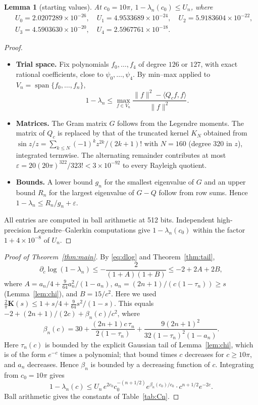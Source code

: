 \documentclass[11pt]{amsart}
\newtheorem{lemma}[proposition]{Lemma}
\theoremstyle{remark}
\numberwithin{equation}{section}
\newcommand{\Kell}{\mathbf{K}}
\begin{document}
\begin{lemma}[starting values]\label{lem:start}
At $c_0=10\pi$, $1-\lambda_n(c_0)\le U_n$, where
\[
\begin{aligned}
&U_0=2.0207289\times10^{-26},\quad U_1=4.9533689\times10^{-24},\quad U_2=5.9183604\times10^{-22},\\
&U_3=4.5903630\times10^{-20},\quad U_4=2.5967761\times10^{-18}.
\end{aligned}
\]
\end{lemma}
\begin{proof}
\begin{itemize}
\item \textbf{Trial space.} Fix polynomials $f_0,\dots,f_4$ of degree $126$ or $127$, with exact rational coefficients, close to $\psi_0,\dots,\psi_4$. By min--max applied to $V_n=\operatorname{span}\{f_0,\dots,f_n\}$,
\[
1-\lambda_n\le\max_{f\in V_n}\frac{\|f\|^2-\langle Q_cf,f\rangle}{\|f\|^2}.
\]
\item \textbf{Matrices.} The Gram matrix $G$ follows from the Legendre moments. The matrix of $Q_c$ is replaced by that of the truncated kernel $K_N$ obtained from $\sin z/z=\sum_{k\le N}(-1)^kz^{2k}/(2k+1)!$ with $N=160$ (degree $320$ in $z$), integrated termwise. The alternating remainder contributes at most $\varepsilon=20(20\pi)^{322}/323!<3\times10^{-92}$ to every Rayleigh quotient.
\item \textbf{Bounds.} A lower bound $g_n$ for the smallest eigenvalue of $G$ and an upper bound $R_n$ for the largest eigenvalue of $G-Q$ follow from row sums. Hence $1-\lambda_n\le R_n/g_n+\varepsilon$.
\end{itemize}
All entries are computed in ball arithmetic at 512 bits. Independent high-precision Legendre--Galerkin computations give $1-\lambda_n(c_0)$ within the factor $1+4\times10^{-8}$ of $U_n$.
\end{proof}

\begin{proof}[Proof of Theorem~\ref{thm:main}]
By \eqref{eq:dlog} and Theorem~\ref{thm:tail},
\[
\partial_c\log(1-\lambda_n)\le-\frac{2}{(1+A)(1+B)}\le-2+2A+2B,
\]
where $A=a_n/4+\frac9{64}a_n^2/(1-a_n)$, $a_n=(2n+1)/(c(1-\tau_n))\ge s$ (Lemma~\ref{lem:chi}), and $B=15/c^2$. Here we used $\frac2\pi\Kell(s)\le1+s/4+\frac9{64}s^2/(1-s)$. This equals $-2+(2n+1)/(2c)+\beta_n(c)/c^2$, where
\[
\beta_n(c)=30+\frac{(2n+1)c\,\tau_n}{2(1-\tau_n)}+\frac{9(2n+1)^2}{32(1-\tau_n)^2(1-a_n)} .
\]
Here $\tau_n(c)$ is bounded by the explicit Gaussian tail of Lemma~\ref{lem:chi}, which is of the form $e^{-c}$ times a polynomial; that bound times $c$ decreases for $c\ge10\pi$, and $a_n$ decreases. Hence $\beta_n$ is bounded by a decreasing function of $c$. Integrating from $c_0=10\pi$ gives
\[
1-\lambda_n(c)\le U_n\,e^{2c_0}c_0^{-(n+1/2)}e^{\beta_n(c_0)/c_0}\cdot c^{n+1/2}e^{-2c}.
\]
Ball arithmetic gives the constants of Table~\ref{tab:Cn}.
\end{proof}
\end{document}

